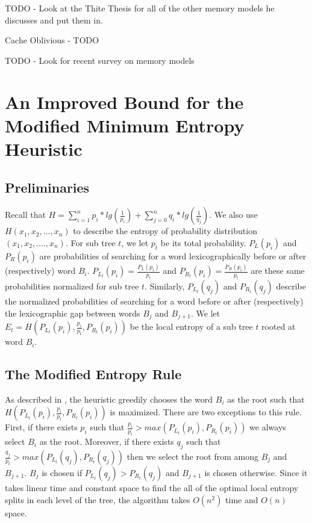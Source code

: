 \documentclass[letterpaper,12pt,titlepage,oneside,final]{book}
\theoremstyle{plain}
\begin{document}
TODO - Look at the Thite Thesis for all of the other memory models he discusses and put them in.

Cache Oblivious - TODO

TODO - Look for recent survey on memory models


\chapter{An Improved Bound for the Modified Minimum Entropy Heuristic}\label{An Improved Bound for the Modified Minimum Entropy Heuristic}

\section{Preliminaries}

Recall that $H = \sum_{i=1}^{n} p_i*lg(\frac{1}{p_i}) + \sum_{j=0}^{n} q_i*lg(\frac{1}{q_j})$. We also use $H(x_1,x_2,...,x_n)$ to describe the entropy of probability distribution $(x_1, x_2, ...., x_n)$. For sub tree $t$, we let $p_t$ be its total probability. $P_{L}(p_i)$ and $P_{R}(p_i)$ are probabilities of searching for a word lexicographically before or after (respectively) word $B_i$. $P_{L_t}(p_i)=\frac{P_L(p_i)}{p_t}$ and $P_{R_t}(p_i)=\frac{P_R(p_i)}{p_t}$ are these same probabilities normalized for sub tree $t$. Similarly, $P_{L_t}(q_j)$ and $P_{R_t}(q_j)$ describe the normalized probabilities of searching for a word before or after (respectively) the lexicographic gap between words $B_j$ and $B_{j+1}$. We let $E_t=H(P_{L_t}(p_i), \frac{p_i}{p_t}, P_{R_t}(p_i))$ be the local entropy of a sub tree $t$ rooted at word $B_i$.  

\section{The Modified Entropy Rule}

As described in \cite{guttler1980binary}, the heuristic greedily chooses the word $B_i$ as the root such that $H(P_{L_t}(p_i), \frac{p_i}{p_t}, P_{R_t}(p_i))$ is maximized. There are two exceptions to this rule. First, if there exists $p_i$ such that $\frac{p_i}{p_t} > max(P_{L_t}(p_i), P_{R_t}(p_i))$ we always select $B_i$ as the root. Moreover, if there exists $q_j$ such that $\frac{q_j}{p_t} > max(P_{L_t}(q_j), P_{R_t}(q_j))$ then we select the root from among $B_j$ and $B_{j+1}$. $B_j$ is chosen if $P_{L_t}(q_j) > P_{R_t}(q_j)$ and $B_{j+1}$ is chosen otherwise. Since it takes linear time and constant space to find the all of the optimal local entropy splits in each level of the tree, the algorithm takes $O(n^2)$ time and $O(n)$ space.  \\
\end{document}

